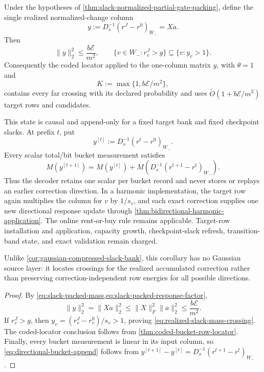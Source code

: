 \begin{corollary}
\label{cor:realized-directional-slack-bank}
Under the hypotheses of
\cref{thm:slack-normalized-partial-gate-packing}, define the single realized
normalized-change column
\begin{equation}
 y:=D_s^{-1}(r^J-r^0)_{W_-}=Xa.
 \label{eq:realized-slack-direction}
\end{equation}
Then
\begin{equation}
 \|y\|_2^2\leq\frac{b\mathcal E}{m^2},
 \qquad
 \{v\in W_-:r_v^J>g\}\subseteq\{v:y_v>1\}.
 \label{eq:realized-slack-mass-crossing}
\end{equation}
Consequently the coded locator applied to the one-column matrix $y$, with
$\theta=1$ and
\begin{equation*}
 K:=\max\{1,b\mathcal E/m^2\},
\end{equation*}
contains every far crossing with its declared probability and uses
$\widetilde O(1+b\mathcal E/m^2)$ target rows and candidates.

This state is causal and append-only for a fixed target bank and fixed
checkpoint slacks.  At prefix $t$, put
\begin{equation*}
 y^{[t]}:=D_s^{-1}(r^t-r^0)_{W_-}.
\end{equation*}
Every scalar total/bit bucket measurement satisfies
\begin{equation}
 M(y^{[t+1]})=M(y^{[t]})
   +M\!\left(D_s^{-1}(r^{t+1}-r^t)_{W_-}\right).
 \label{eq:directional-bucket-append}
\end{equation}
Thus the decoder retains one scalar per bucket record and never stores or
replays an earlier correction direction.  In a harmonic implementation, the
target row again multiplies the column for $v$ by $1/s_v$, and each exact
correction supplies one new directional response update through
\cref{thm:bidirectional-harmonic-application}.  The online rent-or-buy rule
remains applicable.  Target-row installation and application, capacity
growth, checkpoint-slack refresh, transition-band state, and exact validation
remain charged.

Unlike \cref{cor:gaussian-compressed-slack-bank}, this corollary has no
Gaussian source layer: it locates crossings for the realized accumulated
correction rather than preserving correction-independent row energies for all
possible directions.
\end{corollary}

\begin{proof}
By \cref{eq:slack-packed-mass,eq:slack-packed-response-factor},
\begin{equation*}
 \|y\|_2^2=\|Xa\|_2^2
 \leq\|X\|_F^2\|a\|_2^2
 \leq\frac{b\mathcal E}{m^2}.
\end{equation*}
If $r_v^J>g$, then
$y_v=(r_v^J-r_v^0)/s_v>1$, proving
\cref{eq:realized-slack-mass-crossing}.  The coded-locator conclusion follows
from \cref{thm:coded-bucket-row-locator}.  Finally, every bucket measurement
is linear in its input column, so
\cref{eq:directional-bucket-append} follows from
$y^{[t+1]}-y^{[t]}=D_s^{-1}(r^{t+1}-r^t)_{W_-}$.
\end{proof}

